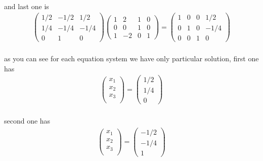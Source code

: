 \documentclass[11pt]{article}
\begin{document}
\paragraph{}and last one is
\begin{eqnarray}
\begin{pmatrix}
	1/2 & -1/2 & 1/2\\
	1/4 & -1/4 & -1/4\\
	0 & 1 & 0
\end{pmatrix}
\left(\begin{array}{ccc|c}  
	1 & 2 & 1 & 0 \\
    0 & 0 & 1 & 0 \\
    1 & -2 & 0 & 1
\end{array}\right)
=
\left(\begin{array}{ccc|c}  
	1 & 0 & 0 & 1/2 \\
    0 & 1 & 0 & -1/4 \\
    0 & 0 & 1 & 0
\end{array}\right)
\end{eqnarray}

\paragraph{}as you can see for each equation system we have only particular solution, first one has
\begin{eqnarray*}
\begin{pmatrix}
x_1\\
x_2\\
x_3\\
\end{pmatrix}
=
\begin{pmatrix}
1/2\\
1/4\\
0
\end{pmatrix}
\end{eqnarray*}
\paragraph{}second one has
\begin{eqnarray*}
\begin{pmatrix}
x_1\\
x_2\\
x_3\\
\end{pmatrix}
=
\begin{pmatrix}
-1/2\\
-1/4\\
1
\end{pmatrix}
\end{eqnarray*}
\end{document}
